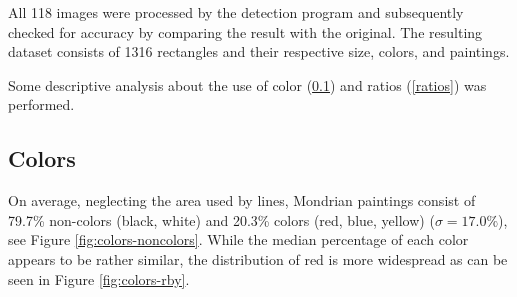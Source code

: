 \documentclass[serif,article,noparskip]{agse-thesis}
\begin{document}
 All 118 images were processed by the detection program and subsequently checked
 for accuracy by comparing the result with the original. The resulting dataset
 consists of 1316 rectangles and their respective size, colors, and paintings.

Some descriptive analysis about the use of color (\ref{color}) and ratios
(\ref{ratios}) was performed.

\subsection{Colors} \label{color}

On average, neglecting the area used by lines, Mondrian paintings consist of
79.7\% non-colors (black, white) and 20.3\% colors (red, blue, yellow) ($\sigma
= 17.0\%$), see Figure \ref{fig:colors-noncolors}. While the median percentage
of each color appears to be rather similar, the distribution of red is more
widespread as can be seen in Figure \ref{fig:colors-rby}.
\end{document}
